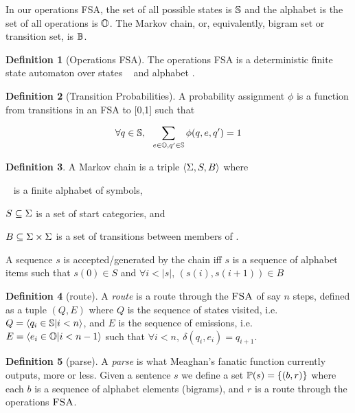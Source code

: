 \documentclass[12pt]{article}
\theoremstyle{definition}
\newtheorem{definition}{Definition}[section]
\begin{document}
In our operations FSA, the set of all possible states is $\mathbb{S}$ and the alphabet is the set of all operations is $\mathbb{O}$. The Markov chain, or, equivalently, bigram set or transition set, is $\mathbb{B}$.


\begin{definition}[Operations FSA]
  The operations FSA is a deterministic finite state automaton over states \STATES~ and alphabet \OPS.
\end{definition}

\begin{definition}[Transition Probabilities]
   
  A probability assignment $\phi$ is a function from transitions in an FSA to [0,1] such that

$$\forall q\in \mathbb{S},~~\sum_{e\in\mathbb{O},q'\in \mathbb{S}} \phi(q,e,q') = 1 $$

\end{definition}

\begin{definition}
  A Markov chain is a triple $\langle \Sigma, S, B  \rangle $ where 

\sg~ is a finite alphabet of symbols, 

$S\subseteq \Sigma$ is a set of start categories, and
 
$B\subseteq \Sigma\times\Sigma$ is a set of transitions between members of \sg.

A sequence $s$ is accepted/generated by the chain iff $s$ is a sequence of alphabet items such that $s(0) \in S$ and $\forall i<|s|$, $(s(i),s(i+1))\in B$ 

\end{definition}

\begin{definition}[route]
  A \emph{route} is a route through the $\textsc{FSA}$ of say $n$ steps, defined as a tuple $(Q,E)$ where $Q$ is the sequence of states visited, i.e.
  $Q=\langle q_i\in\mathbb{S}|i<n\rangle$, and $E$ is the sequence of emissions, i.e. $E=\langle e_i\in\mathbb{O}|i<n-1\rangle$ such that $\forall i<n,~ \delta(q_i,e_i)=q_{i+1}$.
\end{definition}


\begin{definition}[parse]
  A \emph{parse} is what Meaghan's fanatic function currently outputs, more or less.
  Given a sentence $s$ we define a set $\mathbb{P}(s) = \{ (b,r) \}$ where each $b$ is a sequence of alphabet elements (bigrams), and $r$ is a route through the operations $\textsc{FSA}$.
\end{definition}
\end{document}
